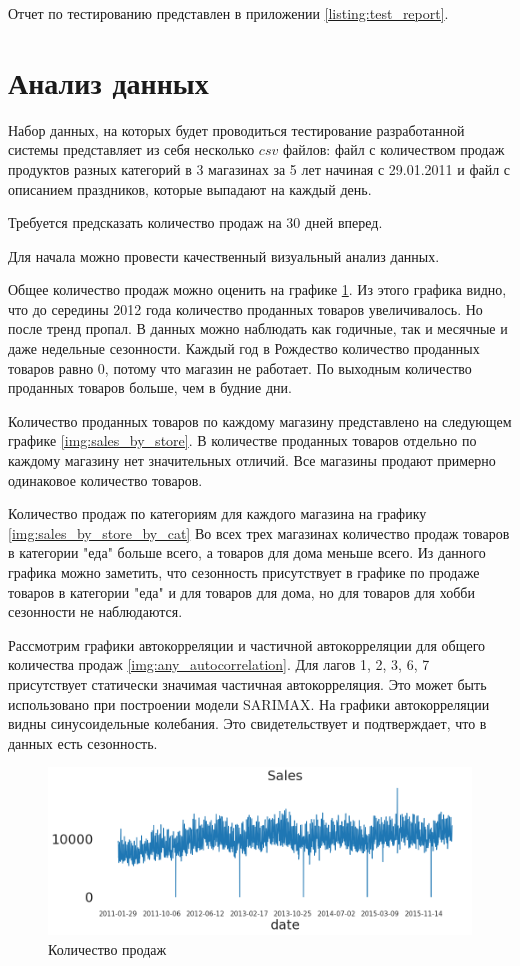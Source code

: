 Отчет по тестированию представлен в приложении \ref{listing:test_report}.

\section{Анализ данных}

Набор данных, на которых будет проводиться тестирование разработанной системы
представляет из себя несколько $ csv $ файлов: файл с количеством продаж
продуктов разных категорий в 3 магазинах за 5 лет начиная с 29.01.2011
и файл с описанием праздников, которые выпадают на каждый день.

Требуется предсказать количество продаж на 30 дней вперед.

Для начала можно провести качественный визуальный анализ данных.

Общее количество продаж можно оценить на графике \ref{img:all_sales}.
Из этого графика видно, что до середины 2012 года количество проданных
товаров увеличивалось. Но после тренд пропал. В данных можно наблюдать
как годичные, так и месячные и даже недельные сезонности. Каждый год
в Рождество количество проданных товаров равно 0, потому что магазин не работает.
По выходным количество проданных товаров больше, чем в будние дни.

Количество проданных товаров по каждому магазину представлено на следующем графике \ref{img:sales_by_store}.
В количестве проданных товаров отдельно по каждому магазину нет значительных отличий.
Все магазины продают примерно одинаковое количество товаров.

Количество продаж по категориям для каждого магазина на графику \ref{img:sales_by_store_by_cat}
Во всех трех магазинах количество продаж товаров в категории "еда" больше всего,
а товаров для дома меньше всего. Из данного графика можно заметить, что сезонность
присутствует в графике по продаже товаров в категории "еда" и для товаров для дома, но
для товаров для хобби сезонности не наблюдаются.

Рассмотрим графики автокорреляции и частичной автокорреляции для общего количества продаж
\ref{img:any_autocorrelation}.
Для лагов 1, 2, 3, 6, 7 присутствует статически значимая частичная автокорреляция.
Это может быть использовано при построении модели SARIMAX.
На графики автокорреляции видны синусоидельные колебания. Это свидетельствует и подтверждает,
что в данных есть сезонность.

\def\figurename{Рис}
\begin{figure}[t]
	\centering
	\includegraphics[width=0.9\columnwidth]{./img/all_sales.png}
	\caption{Количество продаж}
	\label{img:all_sales}
\end{figure}


